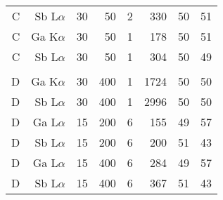 \begin{table}[phtb]
\begin{center}
\begin{tabular}{rrrrrrrr}
            C               & Sb L$\alpha$       & 30             & 50             & 2           & 330               & 50                   & 51                        \\
            C               & Ga K$\alpha$       & 30             & 50             & 1           & 178               & 50                   & 51                        \\
            C               & Sb L$\alpha$       & 30             & 50             & 1           & 304               & 50                   & 49                        \\
            \hline          &                    &                &                &             &                   &                      &                           \\
            D               & Ga K$\alpha$       & 30             & 400            & 1           & 1724              & 50                   & 50                        \\
            D               & Sb L$\alpha$       & 30             & 400            & 1           & 2996              & 50                   & 50                        \\
            D               & Ga L$\alpha$       & 15             & 200            & 6           & 155               & 49                   & 57                        \\
            D               & Sb L$\alpha$       & 15             & 200            & 6           & 200               & 51                   & 43                        \\
            D               & Ga L$\alpha$       & 15             & 400            & 6           & 284               & 49                   & 57                        \\
            D               & Sb L$\alpha$       & 15             & 400            & 6           & 367               & 51                   & 43                        \\
            \hline
        \end{tabular}
    \end{center}
\end{table}



